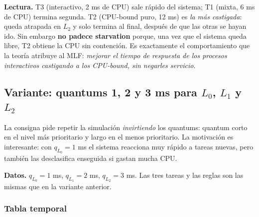 \documentclass[11pt,a4paper]{article}
\begin{document}
\textbf{Lectura.} T3 (interactivo, 2 ms de CPU) sale rápido del
sistema; T1 (mixta, 6 ms de CPU) termina segunda. T2 (CPU-bound puro,
12 ms) es \emph{la más castigada}: queda atrapada en $L_2$ y solo
termina al final, después de que las otras se hayan ido. Sin embargo
\textbf{no padece starvation} porque, una vez que el sistema queda
libre, T2 obtiene la CPU sin contención. Es exactamente el
comportamiento que la teoría atribuye al MLF: \emph{mejorar el tiempo
de respuesta de los procesos interactivos castigando a los CPU-bound,
sin negarles servicio}.

\subsection*{Variante: quantums 1, 2 y 3 ms para $L_0$, $L_1$ y $L_2$}

La consigna pide repetir la simulación \emph{invirtiendo} los quantums:
quantum corto en el nivel más prioritario y largo en el menos
prioritario. La motivación es interesante: con $q_{L_0} = 1$ ms el
sistema reacciona muy rápido a tareas nuevas, pero también las
desclasifica enseguida si gastan mucha CPU.

\textbf{Datos.} $q_{L_0} = 1$ ms, $q_{L_1} = 2$ ms, $q_{L_2} = 3$ ms.
Las tres tareas y las reglas son las mismas que en la variante
anterior.

\subsubsection*{Tabla temporal}
\end{document}
